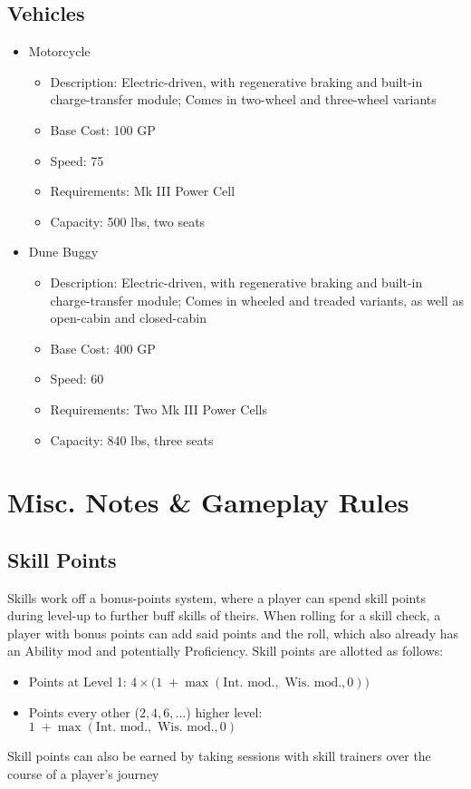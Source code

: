 \documentclass[12pt, landscape]{article}
\begin{document}
\begin{FlushLeft}
\begin{multicols}{2}
			\subsection{Vehicles}
			\begin{itemize}[wide]
				\item Motorcycle
				\begin{itemize}
					\item Description: Electric-driven, with regenerative braking and built-in charge-transfer module; Comes in two-wheel and three-wheel variants
					\item Base Cost: 100 GP
					\item Speed: 75
					\item Requirements: Mk III Power Cell
					\item Capacity: 500 lbs, two seats
				\end{itemize}
				\item Dune Buggy
				\begin{itemize}
					\item Description: Electric-driven, with regenerative braking and built-in charge-transfer module; Comes in wheeled and treaded variants, as well as open-cabin and closed-cabin
					\item Base Cost: 400 GP
					\item Speed: 60
					\item Requirements: Two Mk III Power Cells
					\item Capacity: 840 lbs, three seats
				\end{itemize}
			\end{itemize}
			\vfill \null \columnbreak

			\section{Misc. Notes \& Gameplay Rules}
			\subsection{Skill Points}
			Skills work off a bonus-points system, where a player can spend skill points during level-up to further buff skills of theirs.
			When rolling for a skill check, a player with bonus points can add said points and the roll, which also already has an Ability mod and potentially Proficiency.
			Skill points are allotted as follows:
			\begin{itemize}
				\item Points at Level 1: \linebreak $4 \times \big(1 \; + \max(\text{Int. mod.}, \text{ Wis. mod.}, 0)\big)$
				\item Points every other ($2, 4, 6, \dots$) higher level: \linebreak $1 \; + \max(\text{Int. mod.}, \text{ Wis. mod.}, 0)$
			\end{itemize}
			Skill points can also be earned by taking sessions with skill trainers over the course of a player's journey

\end{multicols}
\end{FlushLeft}
\end{document}
